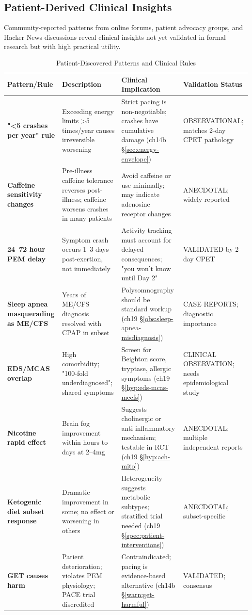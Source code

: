 \subsection{Patient-Derived Clinical Insights}
\label{subsec:patient-clinical-insights}

Community-reported patterns from online forums, patient advocacy groups, and Hacker News discussions reveal clinical insights not yet validated in formal research but with high practical utility.

\begin{table}[htbp]
\centering
\caption{Patient-Discovered Patterns and Clinical Rules}
\label{tab:patient-insights}
\scriptsize
\begin{tabular}{p{3cm}p{4.5cm}p{3.5cm}p{2.5cm}}
\toprule
\textbf{Pattern/Rule} & \textbf{Description} & \textbf{Clinical Implication} & \textbf{Validation Status} \\
\midrule
\textbf{"<5 crashes per year" rule} & Exceeding energy limits >5 times/year causes irreversible worsening & Strict pacing is non-negotiable; crashes have cumulative damage (ch14b \S\ref{sec:energy-envelope}) & OBSERVATIONAL; matches 2-day CPET pathology \\
\midrule
\textbf{Caffeine sensitivity changes} & Pre-illness caffeine tolerance reverses post-illness; caffeine worsens crashes in many patients & Avoid caffeine or use minimally; may indicate adenosine receptor changes & ANECDOTAL; widely reported \\
\midrule
\textbf{24--72 hour PEM delay} & Symptom crash occurs 1--3 days post-exertion, not immediately & Activity tracking must account for delayed consequences; "you won't know until Day 2" & VALIDATED by 2-day CPET~\cite{Lim2020} \\
\midrule
\textbf{Sleep apnea masquerading as ME/CFS} & Years of ME/CFS diagnosis resolved with CPAP in subset & Polysomnography should be standard workup (ch19 \S\ref{obs:sleep-apnea-misdiagnosis}) & CASE REPORTS; diagnostic importance \\
\midrule
\textbf{EDS/MCAS overlap} & High comorbidity; "100-fold underdiagnosed"; shared symptoms & Screen for Beighton score, tryptase, allergic symptoms (ch19 \S\ref{hyp:eds-mcas-mecfs}) & CLINICAL OBSERVATION; needs epidemiological study \\
\midrule
\textbf{Nicotine rapid effect} & Brain fog improvement within hours to days at 2--4mg & Suggests cholinergic or anti-inflammatory mechanism; testable in RCT (ch19 \S\ref{hyp:ach-mito}) & ANECDOTAL; multiple independent reports \\
\midrule
\textbf{Ketogenic diet subset response} & Dramatic improvement in some; no effect or worsening in others & Heterogeneity suggests metabolic subtypes; stratified trial needed (ch19 \S\ref{spec:patient-interventions}) & ANECDOTAL; subset-specific \\
\midrule
\textbf{GET causes harm} & Patient deterioration; violates PEM physiology; PACE trial discredited & Contraindicated; pacing is evidence-based alternative (ch14b \S\ref{warn:get-harmful}) & VALIDATED; consensus \\
\bottomrule
\end{tabular}
\end{table}

